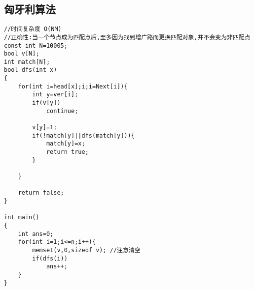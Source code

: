 \documentclass[twocolumn,a4]{article}
\begin{document}
\subsection{匈牙利算法}
\begin{lstlisting}
//时间复杂度 O(NM)
//正确性:当一个节点成为匹配点后,至多因为找到增广路而更换匹配对象,并不会变为非匹配点
const int N=10005;
bool v[N];
int match[N];
bool dfs(int x)
{
    for(int i=head[x];i;i=Next[i]){
        int y=ver[i];
        if(v[y])
            continue;
            
        v[y]=1;
        if(!match[y]||dfs(match[y])){
            match[y]=x;
            return true;
        }
        
    }
    
    return false;
}

int main()
{
    int ans=0;
    for(int i=1;i<=n;i++){
        memset(v,0,sizeof v); //注意清空
        if(dfs(i))
            ans++;
    }
}
\end{lstlisting}
\end{document}

